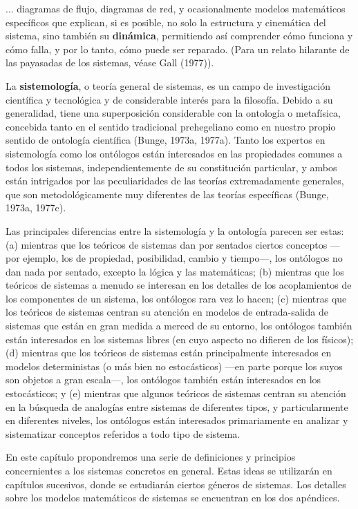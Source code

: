{\fontsize{13}{15}\selectfont
... diagramas de flujo, diagramas de red, y ocasionalmente modelos matemáticos específicos que explican, si es posible, no solo la estructura y cinemática del sistema, sino también su \textbf{dinámica}, permitiendo así comprender cómo funciona y cómo falla, y por lo tanto, cómo puede ser reparado. (Para un relato hilarante de las payasadas de los sistemas, véase Gall (1977)).

La \textbf{sistemología}, o teoría general de sistemas, es un campo de investigación científica y tecnológica y de considerable interés para la filosofía. Debido a su generalidad, tiene una superposición considerable con la ontología o metafísica, concebida tanto en el sentido tradicional prehegeliano como en nuestro propio sentido de ontología científica (Bunge, 1973a, 1977a). Tanto los expertos en sistemología como los ontólogos están interesados en las propiedades comunes a todos los sistemas, independientemente de su constitución particular, y ambos están intrigados por las peculiaridades de las teorías extremadamente generales, que son metodológicamente muy diferentes de las teorías específicas (Bunge, 1973a, 1977c).

Las principales diferencias entre la sistemología y la ontología parecen ser estas: (a) mientras que los teóricos de sistemas dan por sentados ciertos conceptos —por ejemplo, los de propiedad, posibilidad, cambio y tiempo—, los ontólogos no dan nada por sentado, excepto la lógica y las matemáticas; (b) mientras que los teóricos de sistemas a menudo se interesan en los detalles de los acoplamientos de los componentes de un sistema, los ontólogos rara vez lo hacen; (c) mientras que los teóricos de sistemas centran su atención en modelos de entrada-salida de sistemas que están en gran medida a merced de su entorno, los ontólogos también están interesados en los sistemas libres (en cuyo aspecto no difieren de los físicos); (d) mientras que los teóricos de sistemas están principalmente interesados en modelos deterministas (o más bien no estocásticos) —en parte porque los suyos son objetos a gran escala—, los ontólogos también están interesados en los estocásticos; y (e) mientras que algunos teóricos de sistemas centran su atención en la búsqueda de analogías entre sistemas de diferentes tipos, y particularmente en diferentes niveles, los ontólogos están interesados primariamente en analizar y sistematizar conceptos referidos a todo tipo de sistema.

En este capítulo propondremos una serie de definiciones y principios concernientes a los sistemas concretos en general. Estas ideas se utilizarán en capítulos sucesivos, donde se estudiarán ciertos géneros de sistemas. Los detalles sobre los modelos matemáticos de sistemas se encuentran en los dos apéndices.

}
